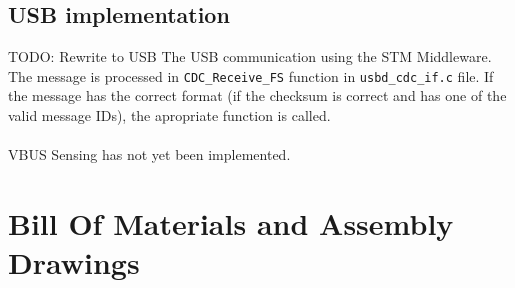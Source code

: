 \documentclass[12pt, a4paper]{article}
\begin{document}
\subsection{USB implementation}
TODO: Rewrite to USB
The USB communication using the STM Middleware. The message is processed in \verb|CDC_Receive_FS| function in \verb|usbd_cdc_if.c| file. If the message has the correct format (if the checksum is correct and has one of the valid message IDs), the apropriate function is called.\\
\\ VBUS Sensing has not yet been implemented.
\pagebreak

\section{Bill Of Materials and Assembly Drawings}
\end{document}
